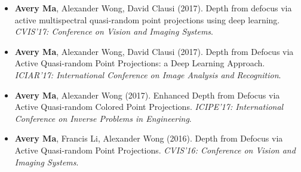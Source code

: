 \begin{adjustwidth}{\indentleft}{\indentright}
\begin{itemize}
            \item \textbf{Avery Ma}, Alexander Wong, David Clausi (2017). Depth from defocus via active multispectral quasi-random point projections using deep learning. \emph{CVIS'17: Conference on Vision and Imaging Systems}.
            
            \item \textbf{Avery Ma}, Alexander Wong, David Clausi (2017). Depth from Defocus via Active Quasi-random Point Projections: a Deep Learning Approach. \emph{ICIAR'17: International Conference on Image Analysis and Recognition}.
            
            \item \textbf{Avery Ma}, Alexander Wong (2017). Enhanced Depth from Defocus via Active Quasi-random Colored Point Projections. \emph{ICIPE'17: International Conference on Inverse Problems in Engineering}.
                   
            \item \textbf{Avery Ma}, Francis Li, Alexander Wong (2016). Depth from Defocus via Active Quasi-random Point Projections. \emph{CVIS'16: Conference on Vision and Imaging Systems}.
       
        \end{itemize}
        \hfill
        
        
 
        
    \end{adjustwidth}
